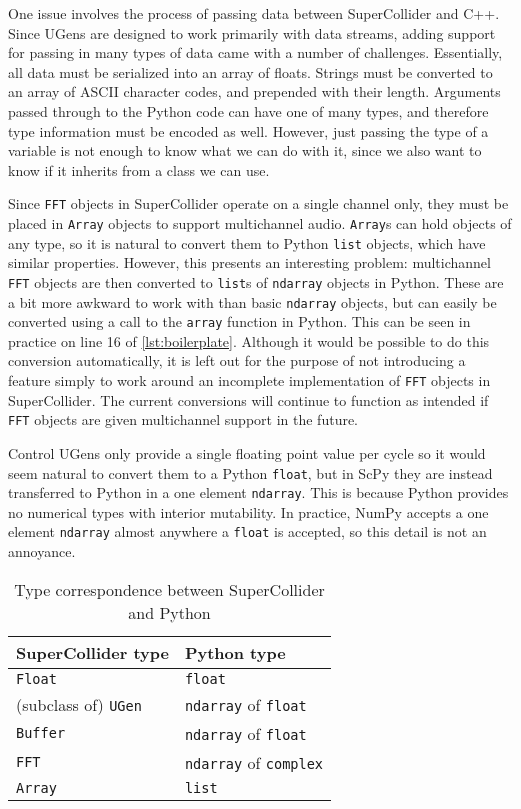 \documentclass{article}
\begin{document}
One issue involves the process of passing data between SuperCollider and C++. Since UGens are
designed to work primarily with data streams, adding support for passing in many types of data came
with a number of challenges. Essentially, all data must be serialized into an array of floats.
Strings must be converted to an array of ASCII character codes, and prepended with their length.
Arguments passed through to the Python code can have one of many types, and therefore type
information must be encoded as well. However, just passing the type of a variable is not enough to
know what we can do with it, since we also want to know if it inherits from a class we can use.

Since \texttt{FFT} objects in SuperCollider operate on a single channel only, they must be placed
in \texttt{Array} objects to support multichannel audio. \texttt{Array}s can hold objects of any
type, so it is natural to convert them to Python \texttt{list} objects, which have similar
properties. However, this presents an interesting problem: multichannel \texttt{FFT} objects are
then converted to \texttt{list}s of \texttt{ndarray} objects in Python. These are a bit more
awkward to work with than basic \texttt{ndarray} objects, but can easily be converted using a call
to the \texttt{array} function in Python. This can be seen in practice on line 16 of
\autoref{lst:boilerplate}. Although it would be possible to do this conversion
automatically, it is left out for the purpose of not introducing a feature simply to work around an
incomplete implementation of \texttt{FFT} objects in SuperCollider. The current conversions will
continue to function as intended if \texttt{FFT} objects are given multichannel support in the
future.

Control UGens only provide a single floating point value per cycle so it would seem natural to
convert them to a Python \texttt{float}, but in ScPy they are instead transferred to Python in a
one element \texttt{ndarray}. This is because Python provides no numerical types with interior
mutability. In practice, NumPy accepts a one element \texttt{ndarray} almost anywhere a
\texttt{float} is accepted, so this detail is not an annoyance.

\begin{table}[ht]
    \caption{Type correspondence between SuperCollider and Python}
    \begin{center}
        \begin{tabular}{ll}
            \toprule
            SuperCollider type & Python type \\
            \midrule
            \texttt{Float} & \texttt{float} \\
            (subclass of) \texttt{UGen} & \texttt{ndarray} of \texttt{float} \\
            \texttt{Buffer} & \texttt{ndarray} of \texttt{float} \\
            \texttt{FFT} & \texttt{ndarray} of \texttt{complex} \\
            \texttt{Array} & \texttt{list} \\
            \bottomrule
        \end{tabular}
    \end{center}
\end{table}
\end{document}
